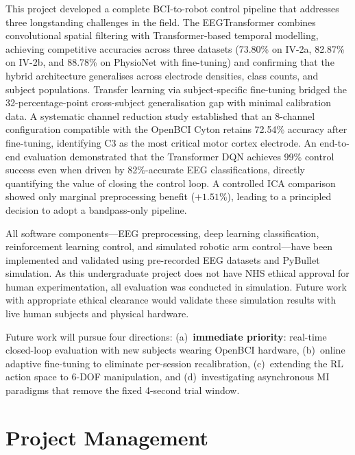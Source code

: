 \documentclass[12pt, a4paper]{article}
\begin{document}
This project developed a complete BCI-to-robot control pipeline that addresses three longstanding challenges in the field. The EEGTransformer combines convolutional spatial filtering with Transformer-based temporal modelling, achieving competitive accuracies across three datasets (73.80\% on IV-2a, 82.87\% on IV-2b, and 88.78\% on PhysioNet with fine-tuning) and confirming that the hybrid architecture generalises across electrode densities, class counts, and subject populations. Transfer learning via subject-specific fine-tuning bridged the 32-percentage-point cross-subject generalisation gap with minimal calibration data. A systematic channel reduction study established that an 8-channel configuration compatible with the OpenBCI Cyton retains 72.54\% accuracy after fine-tuning, identifying C3 as the most critical motor cortex electrode. An end-to-end evaluation demonstrated that the Transformer DQN achieves 99\% control success even when driven by 82\%-accurate EEG classifications, directly quantifying the value of closing the control loop. A controlled ICA comparison showed only marginal preprocessing benefit ($+1.51\%$), leading to a principled decision to adopt a bandpass-only pipeline.

All software components---EEG preprocessing, deep learning classification, reinforcement learning control, and simulated robotic arm control---have been implemented and validated using pre-recorded EEG datasets and PyBullet simulation. As this undergraduate project does not have NHS ethical approval for human experimentation, all evaluation was conducted in simulation. Future work with appropriate ethical clearance would validate these simulation results with live human subjects and physical hardware.

Future work will pursue four directions: (a)~\textbf{immediate priority}: real-time closed-loop evaluation with new subjects wearing OpenBCI hardware, (b)~online adaptive fine-tuning to eliminate per-session recalibration, (c)~extending the RL action space to 6-DOF manipulation, and (d)~investigating asynchronous MI paradigms that remove the fixed 4-second trial window.

\section{Project Management}
\end{document}
